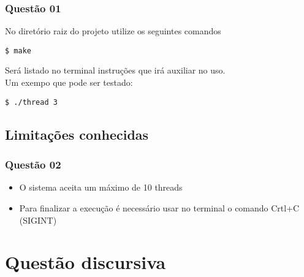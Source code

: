 \documentclass[11pt,a4paper]{article}
\begin{document}
\subsubsection{Questão 01}
No diretório raiz do projeto utilize os seguintes comandos
\begin{verbatim}
$ make
\end{verbatim}
Será listado no terminal instruções que irá auxiliar no uso.\\
Um exempo que pode ser testado:
\begin{verbatim}
$ ./thread 3
\end{verbatim}

\subsection{Limitações conhecidas}
\subsubsection{Questão 02}
\begin{itemize}
  \item O sistema aceita um máximo de 10 threads
  \item Para finalizar a execução é necessário usar no terminal o comando Crtl+C (SIGINT)
\end{itemize}

\section{Questão discursiva}
\end{document}
